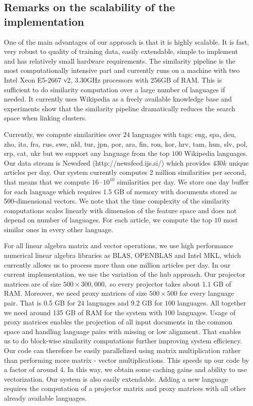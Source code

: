 \documentclass[twoside,11pt]{article}
\begin{document}
\subsection{Remarks on the scalability of the implementation}

One of the main advantages of our approach is that it is highly scalable. It is fast, very robust to quality of training data, easily extendable, simple to implement and has relatively small hardware requirements. The similarity pipeline is the most computationally intensive part and currently runs on a machine with two Intel Xeon E5-2667 v2, 3.30GHz processors with 256GB of RAM. This is sufficient to do similarity computation over a large number of languages if needed. It currently uses Wikipedia as a freely available knowledge base and experiments show that the similarity pipeline dramatically reduces the search space when linking clusters.

Currently, we compute similarities over $24$ languages with tags: eng, spa, deu, zho, ita, fra, rus, swe, nld, tur, jpn, por, ara, fin, ron, kor, hrv, tam, hun, slv, pol, srp, cat, ukr but we support any language from the top $100$ Wikipedia languages. Our data stream is Newsfeed (http://newsfeed.ijs.si/) which provides $430k$ unique articles per day. Our system currently computes 2 million similarities per second, that means that we compute $16 \cdot 10^{10}$ similarities per day. We
store one day buffer for each language which requires 1.5 GB of memory with documents   stored as 500-dimensional vectors. We  note that the time complexity of the similarity computations scales linearly with dimension of the feature space and does not  depend on number of languages. For each article, we compute the top $10$  most similar ones in every other language.

For all linear algebra matrix and vector operations, we use high performance numerical linear algebra libraries as BLAS, OPENBLAS and Intel MKL, which currently allows us to process more than one million articles per day.
In our current implementation, we use the variation of the hub approach. Our projector matrices are of size $500\times 300,000,$ so every projector takes about $1.1$ GB of RAM. Moreover, we need proxy matrices of size $500\times500$ for every language pair. That is 0.5 GB for $24$ languages and $9.2$ GB for $100$ languages. All together we need around 135 GB of RAM for the system with 100 languages.
 Usage of proxy matrices enables the projection of all input documents in the common space and handling language pairs with missing or low alignment. That enables us to do block-wise similarity computations further improving system efficiency. Our code can therefore be easily parallelized using matrix multiplication rather than performing more matrix - vector multiplications. This speeds up our code by a factor of around $4.$ In this way, we obtain some caching gains and ability to use vectorization.
Our system is also easily extendable. Adding a new language requires the  computation of  a projector matrix and proxy matrices with all other already available languages.
\end{document}
